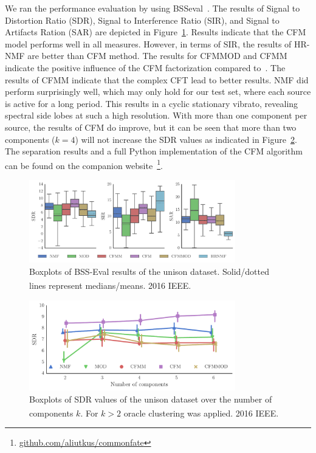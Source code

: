 We ran the performance evaluation by using BSSeval~\cite{vincent06}. 
The results of Signal to Distortion Ratio (SDR), Signal to Interference Ratio (SIR), and Signal to Artifacts Ration (SAR) are depicted in Figure~\ref{fig:boxplot_overall}. 
Results indicate that the CFM model performs well in all measures. 
However, in terms of SIR, the results of HR-NMF are better than CFM method. 
The results for CFMMOD and CFMM indicate the positive influence of the CFM factorization compared to~\cite{barker13}.
The results of CFMM indicate that the complex CFT lead to better results. 
\acs{NMF} did perform surprisingly well, which may only hold for our test set, where each source is active for a long period. 
This results in a cyclic stationary vibrato, revealing spectral side lobes at such a high resolution. 
With more than one component per source, the results of CFM do improve, but it can be seen that more than two components ($k=4$) will not increase the SDR values as indicated in Figure~\ref{fig:iterations}. 
The separation results and a full Python implementation of the CFM algorithm can be found on the companion website~\footnote{\url{github.com/aliutkus/commonfate}}.

\begin{figure}[ht!]
\centering
        \includegraphics[width=0.8\textwidth]{Chapters/06_Separation_Unknown/figures/cfm_boxplot.pdf}
\caption{Boxplots of BSS-Eval results of the unison dataset. Solid/dotted lines represent medians/means. \textsuperscript{\textregistered}2016 IEEE.}
\label{fig:boxplot_overall}
\end{figure}

\begin{figure}[ht!]
\centering
        \includegraphics[width=0.8\textwidth]{Chapters/06_Separation_Unknown/figures/iterations.pdf}
\caption{Boxplots of SDR values of the unison dataset over the number of components $k$. For $k>2$ oracle clustering was applied. \textsuperscript{\textregistered}2016 IEEE.}
\label{fig:iterations}
\end{figure}

